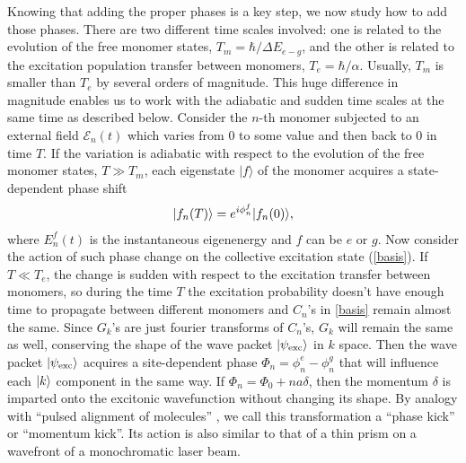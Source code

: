 Knowing that adding the proper phases is a key step, we now study how to add those phases. There are two
 different time scales involved: one is related to the evolution of the free monomer states, 
$T_m = \hbar/\Delta E_{e-g}$, and the other is related to the excitation population transfer between monomers,
 $T_e = \hbar/\alpha$. Usually, $T_m$ is smaller than $T_e$ by several orders of magnitude. This huge
 difference in magnitude enables us to work with the adiabatic and sudden time scales at the same time as described below. 
Consider  the $n$-th monomer subjected to an external field
$\mathcal{E}_n(t)$ which varies from 0 to some value and then back
to 0 in time $T$. If the variation is adiabatic with respect to
the evolution of the free monomer states, $T\gg T_m$, each eigenstate $|f\rangle$ of the monomer acquires a
state-dependent phase shift \cite{adiabatic-theo}
%
\begin{eqnarray}
| f_n (T) \rangle = e^{i \phi_{n}^f}| f_n(0) \rangle,
\label{adiabatic-theorem} \label{phase}
\end{eqnarray}
%
where 
$E_{n}^f (t)$ is the instantaneous eigenenergy and $f$ can be $e$
or $g$.
Now consider the action of such phase change on the collective
excitation state (\ref{basis}). If $T\ll T_e$, the
change is sudden with respect to the excitation transfer between
monomers, so during the time $T$ the excitation probability doesn't have enough time to propagate 
between different monomers and $C_n$'s in \autoref{basis} remain almost the same. Since $G_k$'s are just fourier
transforms of $C_n$'s, $G_k$ will remain the same as well, conserving the shape of the wave packet $|\psi_{\rm exc}\rangle$ in $k$ space. 
 Then the wave packet $|\psi_{\rm exc}\rangle$ acquires a site-dependent
phase $\Phi_n = \phi_{n}^e-\phi_{n}^g$ that will influence each $| k \rangle$ component in the same way. 
If $\Phi_n = \Phi_0 + n a\delta $, then the momentum $\delta$ is imparted onto the
excitonic wavefunction without changing its shape. By analogy with ``pulsed alignment of
molecules'' \cite{alignment-review}, we call this transformation a
``phase kick'' or ``momentum kick''. Its action is also similar to
that of a thin prism on a wavefront of a monochromatic laser beam.

